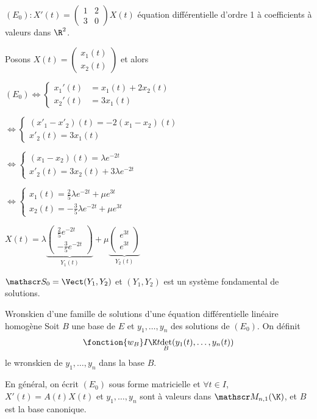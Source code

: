 \begin{exemple}
    $(E_0) : X'(t) = \begin{pmatrix}
        1 & 2 \\ 
        3 & 0
    \end{pmatrix} X(t)$ équation différentielle d'ordre 1 à coefficients à valeurs dans $\R^2$. 

    Posons $X(t) = \begin{pmatrix}
        x_1(t) \\ x_2(t)
    \end{pmatrix}$ et alors 

    $(E_0) \Leftrightarrow \begin{cases}
        x_1'(t) & = x_1(t) + 2x_2(t) \\
        x_2'(t) & = 3x_1(t)
    \end{cases}$

    $\Leftrightarrow \begin{cases}
        (x'_1 - x'_2)(t) = -2 (x_1 - x_2)(t) \\
        x'_2(t) = 3 x_1(t)
    \end{cases}$

    \svspace $\Leftrightarrow \begin{cases}
        (x_1 - x_2)(t) = \lambda e^{-2t} \\
        x'_2(t) = 3x_2(t) + 3 \lambda e^{-2t}
    \end{cases}$

    \svspace $\Leftrightarrow \begin{cases}
        x_1(t) = \frac 2 5 \lambda e^{-2t} + \mu e^{3t} \\
        x_2(t) = -\frac 3 5 \lambda e^{-2t} + \mu e^{3t}
    \end{cases}$

    \svspace $X(t) = \lambda \underbrace{\begin{pmatrix}
        \frac 2 5 e^{-2t} \\ -\frac 3 5 e^{-2t}
    \end{pmatrix}}_{Y_1(t)} + \mu \underbrace{\begin{pmatrix}
        e^{3t} \\ e^{3t}
    \end{pmatrix}}_{Y_2(t)}$

    $\mathscr S_0 = \Vect (Y_1, Y_2)$ et $(Y_1, Y_2)$ est un système fondamental de solutions.
\end{exemple}

\begin{definitionnt}{Wronskien d'une famille de solutions d'une équation différentielle linéaire homogène}{}
    Soit $B$ une base de $E$ et $y_1, \dots, y_n$ des solutions de $(E_0)$. 
    On définit $$\fonction{w_B} I \K t {\det_B (y_1(t), \dots, y_n(t))}$$
    le wronskien de $y_1, \dots, y_n$ dans la base $B$.

    En général, on écrit $(E_0)$ sous forme matricielle et $\forall t \in I$, 
    $X'(t) = A(t) X(t)$ et 
    $y_1, \dots, y_n$ sont à valeurs dans $\mathscr M_{n, 1}(\K)$, et $B$ est la base canonique. 
\end{definitionnt}

